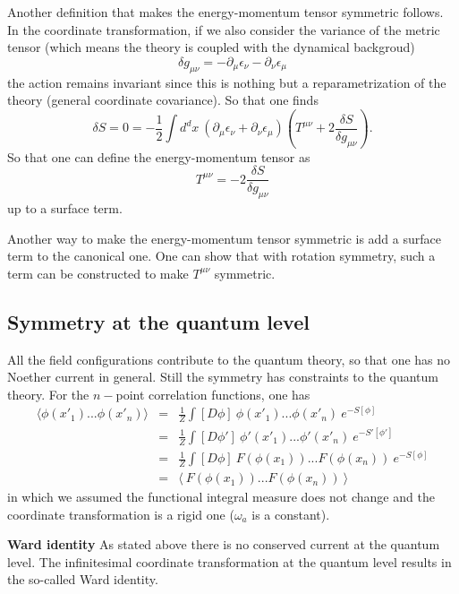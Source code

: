 \documentclass[submission, PhysLectNotes]{SciPost}
\begin{document}
Another definition that makes the energy-momentum tensor symmetric follows. In the coordinate transformation, if we also consider the variance of the metric tensor (which means the theory is coupled with the dynamical backgroud)
\begin{equation}
\delta g_{\mu\nu} = -\partial_\mu\epsilon_\nu -\partial_\nu\epsilon_\mu
\end{equation}
the action remains invariant since this is nothing but a reparametrization of the theory (general coordinate covariance). So that one finds
\begin{equation}
    \delta S = 0 = -\frac{1}{2} \int d^d x \ \left(\partial_\mu\epsilon_\nu + \partial_\nu\epsilon_\mu\right) \left(T^{\mu\nu} +2\frac{\delta S}{\delta g_{\mu\nu}}\right).
\end{equation}
So that one can define the energy-momentum tensor as
\begin{equation}
    T^{\mu\nu} = -2\frac{\delta S}{\delta g_{\mu\nu}}
\end{equation}
up to a surface term.

Another way to make the energy-momentum tensor symmetric is add a surface term to the canonical one. One can show that with rotation symmetry, such a term can be constructed to make $T^{\mu\nu}$ symmetric.

\subsection{Symmetry at the quantum level}
All the field configurations contribute to the quantum theory, so that one has no Noether current in general. Still the symmetry has constraints to the quantum theory. For the $n-$point correlation functions, one has
\begin{eqnarray}
\langle \phi(x'_1)...\phi(x'_n) \rangle &=& \frac{1}{Z}\int [D\phi]\ \phi(x'_1)...\phi(x'_n) \ e^{-S[\phi]} \\
&=& \frac{1}{Z}\int [D\phi']\ \phi'(x'_1)...\phi'(x'_n) \ e^{-S'[\phi']} \\
&=& \frac{1}{Z}\int [D\phi]\ F(\phi(x_1))...F(\phi(x_n)) \ e^{-S[\phi]} \\
&=& \langle\ F(\phi(x_1))...F(\phi(x_n)) \ \rangle
\end{eqnarray}
in which we assumed the functional integral measure does not change and the coordinate transformation is a rigid one ($\omega_a$ is a constant).

{\bf Ward identity}
As stated above there is no conserved current at the quantum level. The infinitesimal coordinate transformation at the quantum level results in the so-called Ward identity.
\end{document}
